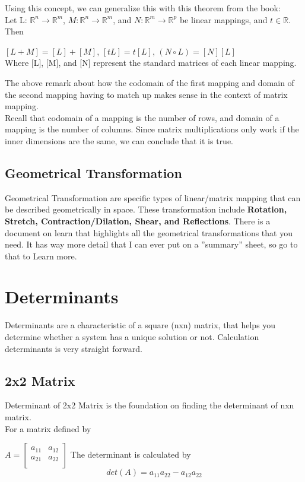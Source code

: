 \documentclass[12pt]{article}
\newcommand{\R}{\mathbb{R}}
\begin{document}
Using this concept, we can generalize this with this theorem from the book:\\
Let L: $\R^n \rightarrow \R^m$, $M: \R^n \rightarrow \R^m$, and $N: \R^m \rightarrow \R^p$  be linear mappings, and $t \in \R$. Then\\
\begin{center}
$[L+M] = [L] + [M]$, $[tL] = t[L]$, $(N \circ L) = [N][L]$\\
Where [L], [M], and [N] represent the standard matrices of each linear mapping.
\end{center} 
\cite{textbook}
The above remark about how the codomain of the first mapping and domain of the second mapping having to match up makes sense in the context of matrix mapping.\\
Recall that codomain of a mapping is the number of rows, and domain of a mapping is the number of columns. Since matrix multiplications only work if the inner dimensions are the same, we can conclude that it is true.\\


\subsection{Geometrical Transformation}
Geometrical Transformation are specific types of linear/matrix mapping that can be described geometrically in space. These transformation include \textbf{Rotation, Stretch, Contraction/Dilation, Shear, and Reflections}. There is a document on learn that highlights all the geometrical transformations that you need. It has way more detail that I can ever put on a ''summary'' sheet, so go to that to Learn more.

\section{Determinants}
Determinants are a characteristic of a square (nxn) matrix, that helps you determine whether a system has a unique solution or not. Calculation determinants is very straight forward.
\subsection{2x2 Matrix}
Determinant of 2x2 Matrix is the foundation on finding the determinant of nxn matrix.\\
For a matrix defined by\\
\begin{center}
$
A = \begin{bmatrix}
   a_{11} & a_{12}\\ a_{21} & a_{22}\\ 
 \end{bmatrix}
$ 
The determinant is calculated by\\
\begin{equation}
det(A) = a_{11}a_{22} - a_{12}a_{22}
\end{equation}
\end{center}
\end{document}

